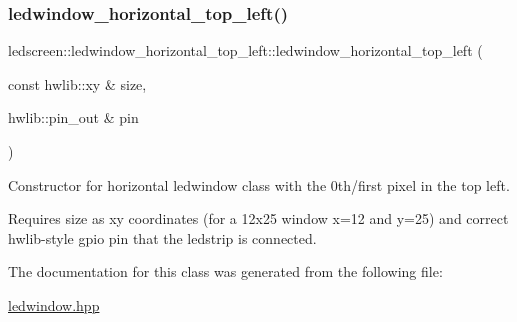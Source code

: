 \subsubsection{\texorpdfstring{ledwindow\+\_\+horizontal\+\_\+top\+\_\+left()}{ledwindow\_horizontal\_top\_left()}}
{\footnotesize\ttfamily ledscreen\+::ledwindow\+\_\+horizontal\+\_\+top\+\_\+left\+::ledwindow\+\_\+horizontal\+\_\+top\+\_\+left (\begin{DoxyParamCaption}\item[{const hwlib\+::xy \&}]{size,  }\item[{hwlib\+::pin\+\_\+out \&}]{pin }\end{DoxyParamCaption})\hspace{0.3cm}{\ttfamily [inline]}}



Constructor for horizontal ledwindow class with the 0th/first pixel in the top left. 

Requires size as xy coordinates (for a 12x25 window x=12 and y=25) and correct hwlib-\/style gpio pin that the ledstrip is connected. 

The documentation for this class was generated from the following file\+:\begin{DoxyCompactItemize}
\item 
\hyperlink{ledwindow_8hpp}{ledwindow.\+hpp}\end{DoxyCompactItemize}

